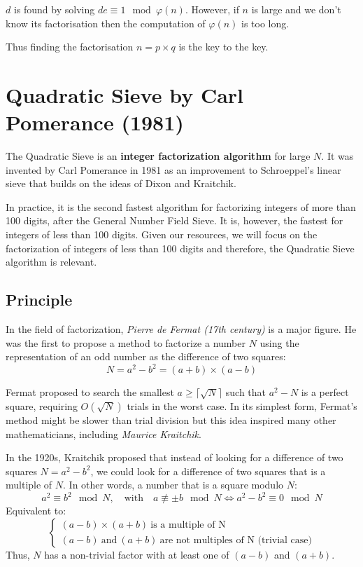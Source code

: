 \documentclass[a4paper, 11pt]{article}
\begin{document}
$d$ is found by solving $de \equiv 1 \mod \varphi(n)$. However, if $n$ is large and we don't know its factorisation then the computation of $\varphi(n)$ is too long.

Thus finding the factorisation $n = p \times q$ is the key to the key.

\section{Quadratic Sieve by Carl Pomerance (1981)}

The Quadratic Sieve is an \textbf{integer factorization algorithm} for large $N$. It was invented by Carl Pomerance in 1981 as an improvement to Schroeppel's linear sieve that builds on the ideas of Dixon and Kraitchik.

In practice, it is the second fastest algorithm for factorizing integers of more than 100 digits, after the General Number Field Sieve. It is, however, the fastest for integers of less than 100 digits. Given our resources, we will focus on the factorization of integers of less than 100 digits and therefore, the Quadratic Sieve algorithm is relevant.


\subsection{Principle}
In the field of factorization, \textit{Pierre de Fermat (17th century)} is a
major figure. He was the first to propose a method to factorize a number $N$
using the representation of an odd number as the difference of two squares:
\begin{equation}
    N = a^2 - b^2 = (a + b) \times (a - b)
\end{equation}

Fermat proposed to search the smallest $a \geq \lceil \sqrt{N} \rceil$ such that $a^2 - N$ is a perfect square, requiring $O(\sqrt{N})$ trials in the worst case. In its simplest form, Fermat's method might be slower than trial division but this idea inspired many other mathematicians, including \textit{Maurice Kraitchik}.

In the 1920s, Kraitchik proposed that instead of looking for a difference of
two squares $N = a^2 - b^2$, we could look for a difference of two squares that
is a multiple of $N$. In other words, a number that is a square modulo $N$:
\begin{equation}
    a^2 \equiv b^2 \mod{N}, \quad \text{with} \quad a \not\equiv \pm b \mod{N} \iff a^2 - b^2 \equiv 0 \mod{N}
\end{equation}
Equivalent to:
\begin{equation}
    \left\{
    \begin{array}{ll}
        (a - b) \times (a + b) \ \text{is a multiple of N} \\
        (a-b) \ \text{and} \ (a+b) \ \text{are not multiples of N (trivial case)}
    \end{array}
    \right.
\end{equation}
Thus, $N$ has a non-trivial factor with at least one of $(a-b)$ and $(a+b).$
\end{document}
